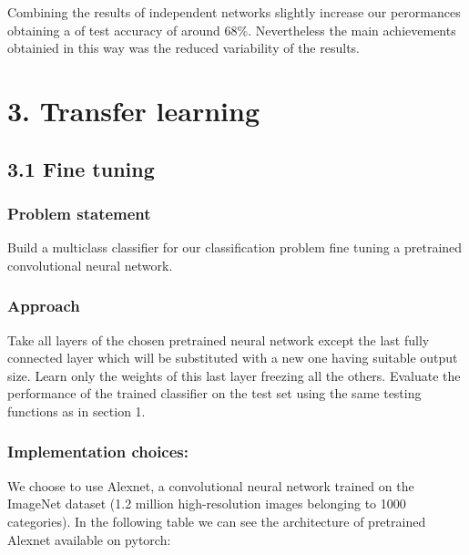 \documentclass[12pt, a4paper]{report}
\begin{document}
Combining the results of independent networks slightly increase our perormances obtaining a of test accuracy of around 68\%. Nevertheless the main achievements obtainied in this way was the reduced variability of the results. 

\section*{3. Transfer learning}
\subsection*{3.1 Fine tuning}
\subsubsection*{Problem statement}
Build a multiclass classifier for our classification problem fine tuning a pretrained convolutional neural network.

\subsubsection*{Approach}
Take all layers of the chosen pretrained neural network except the last fully connected layer which will be substituted with a new one having suitable output size. Learn only the weights of this last layer freezing all the others. Evaluate the performance of the trained classifier on the test set using the same testing functions as in section 1.

\subsubsection*{Implementation choices:}
We choose to use Alexnet, a convolutional neural network trained on the ImageNet dataset (1.2 million high-resolution images belonging to 1000 categories). 
In the following table we can see the architecture of pretrained Alexnet available on pytorch:
\end{document}
